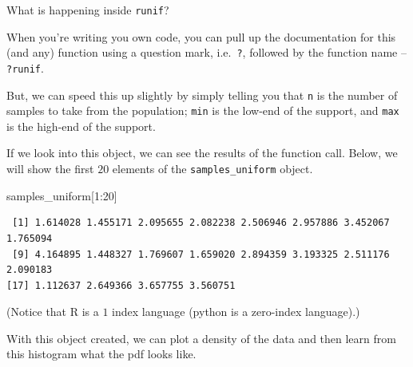 \documentclass[
  letterpaper,
  DIV=11,
  numbers=noendperiod]{scrreprt}
\newenvironment{Shaded}{\begin{snugshade}}{\end{snugshade}}
\newcommand{\DecValTok}[1]{\textcolor[rgb]{0.68,0.00,0.00}{#1}}
\newcommand{\NormalTok}[1]{\textcolor[rgb]{0.00,0.23,0.31}{#1}}
\newcommand{\SpecialCharTok}[1]{\textcolor[rgb]{0.37,0.37,0.37}{#1}}
\begin{document}
What is happening inside \texttt{runif}?

When you're writing you own code, you can pull up the documentation for
this (and any) function using a question mark, i.e.~\texttt{?}, followed
by the function name -- \texttt{?runif}.

But, we can speed this up slightly by simply telling you that \texttt{n}
is the number of samples to take from the population; \texttt{min} is
the low-end of the support, and \texttt{max} is the high-end of the
support.

If we look into this object, we can see the results of the function
call. Below, we will show the first \(20\) elements of the
\texttt{samples\_uniform} object.

\begin{Shaded}
\begin{Highlighting}[]
\NormalTok{samples\_uniform[}\DecValTok{1}\SpecialCharTok{:}\DecValTok{20}\NormalTok{]}
\end{Highlighting}
\end{Shaded}

\begin{verbatim}
 [1] 1.614028 1.455171 2.095655 2.082238 2.506946 2.957886 3.452067 1.765094
 [9] 4.164895 1.448327 1.769607 1.659020 2.894359 3.193325 2.511176 2.090183
[17] 1.112637 2.649366 3.657755 3.560751
\end{verbatim}

(Notice that R is a \(1\) index language (python is a zero-index
language).)

With this object created, we can plot a density of the data and then
learn from this histogram what the pdf looks like.
\end{document}
